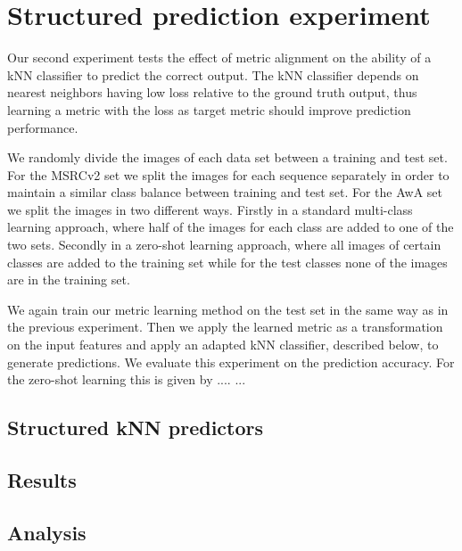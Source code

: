 \section{Structured prediction experiment}

Our second experiment tests the effect of metric alignment on the ability of a \acf{kNN} classifier to predict the correct output. The \ac{kNN} classifier depends on nearest neighbors having low loss relative to the ground truth output, thus learning a metric with the loss as target metric should improve prediction performance.

We randomly divide the images of each data set between a training and test set. For the \ac{MSRCv2} set we split the images for each sequence separately in order to maintain a similar class balance between training and test set. For the \ac{AwA} set we split the images in two different ways. Firstly in a standard multi-class learning approach, where half of the images for each class are added to one of the two sets. Secondly in a zero-shot learning approach, where all images of certain classes are added to the training set while for the test classes none of the images are in the training set. 

We again train our metric learning method on the test set in the same way as in the previous experiment. Then we apply the learned metric as a transformation on the input features and apply an adapted \ac{kNN} classifier, described below, to generate predictions. We evaluate this experiment on the prediction accuracy. For the zero-shot learning this is given by ....
... 


\subsection{Structured kNN predictors}




\subsection{Results}


\subsection{Analysis}





































